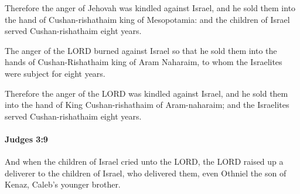 			\begin{versebox}
					\item[BHS] 
					\item[ASV] Therefore the anger of Jehovah was kindled against Israel, and he sold them into the hand of Cushan-rishathaim king of Mesopotamia: and the children of Israel served Cushan-rishathaim eight years.
					\item[NIV] The anger of the LORD burned against Israel so that he sold them into the hands of Cushan-Rishathaim king of Aram Naharaim, to whom the Israelites were subject for eight years.
					\item[NRSV] Therefore the anger of the LORD was kindled against Israel, and he sold them into the hand of King Cushan-rishathaim of Aram-naharaim; and the Israelites served Cushan-rishathaim eight years.
			\end{versebox}

		\paragraph{Judges 3:9} %
			\label{JUDGES-3-9}

			And when the children of Israel cried unto the LORD, the LORD raised up a deliverer to the children of Israel, who delivered them, even Othniel the son of Kenaz, Caleb’s younger brother.

